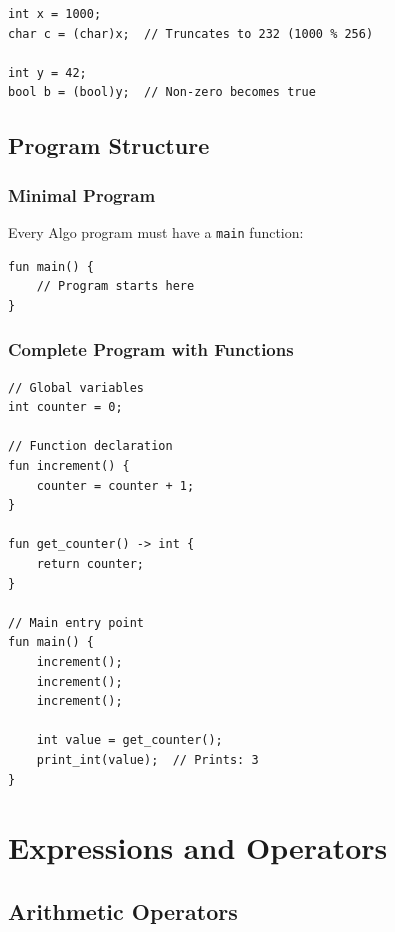 \documentclass[12pt,a4paper,oneside]{book}
\newcommand{\code}[1]{\texttt{#1}}
\begin{document}
\begin{lstlisting}[style=algo]
int x = 1000;
char c = (char)x;  // Truncates to 232 (1000 % 256)

int y = 42;
bool b = (bool)y;  // Non-zero becomes true
\end{lstlisting}

\section{Program Structure}

\subsection{Minimal Program}

Every Algo program must have a \code{main} function:

\begin{lstlisting}[style=algo]
fun main() {
    // Program starts here
}
\end{lstlisting}

\subsection{Complete Program with Functions}

\begin{lstlisting}[style=algo, caption={Complete Algo Program Structure}]
// Global variables
int counter = 0;

// Function declaration
fun increment() {
    counter = counter + 1;
}

fun get_counter() -> int {
    return counter;
}

// Main entry point
fun main() {
    increment();
    increment();
    increment();
    
    int value = get_counter();
    print_int(value);  // Prints: 3
}
\end{lstlisting}

\chapter{Expressions and Operators}

\section{Arithmetic Operators}
\end{document}
